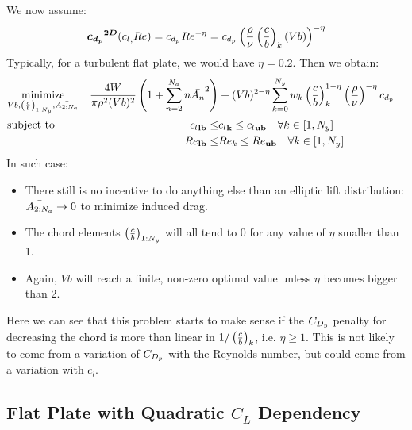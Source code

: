 \documentclass[letterpaper,12pt]{article}
\begin{document}
We now assume:
$$\boldsymbol{{c_{d_p}}^{2D}}({c_l}_{\bf ,} Re) = {c_{d_p}}_{\bf } Re^{-\eta} = {c_{d_p}}_{\bf }
\left(\frac{\rho}{\nu}\left( \frac c b \right)_{k}(Vb)\right)^{-\eta}$$
Typically, for a turbulent flat plate, we would have $\eta=0.2$.
Then we obtain:
\begin{align*}
	& \underset{Vb, \left( \frac c b \right)_{1:N_y}, \bar{A_{2:N_a}}}{\text{minimize}}  &
	\frac{4W}{\pi \rho^2 (Vb)^2} \left(1+\sum_{n=2}^{N_a} n \bar{A_{n}}^2\right) &+
	(Vb)^{2-\eta} \sum_{k=0}^{N_y} w_k \left( \frac c b \right)_{k}^{1-\eta} \left(\frac{\rho}{\nu}\right)^{-\eta}{c_{d_p}}_{\bf }  & \\
	& \text{subject to} & {c_l}_{\bf lb} \leq &{c_l}_{\bf k} \leq {c_l}_{\bf ub} \quad \forall k \in [1, N_y] \\
	& & {Re}_{\bf lb} \leq &{Re_k} \leq {Re}_{\bf ub} \quad \forall k \in [1, N_y] 
\end{align*}
%
In such case:
\begin{itemize}
	\item There still is no incentive to do anything else than an elliptic lift distribution: $\bar{A_{2:N_a}} \rightarrow 0 $ to minimize induced drag.
	\item  The chord elements $\left( \frac c b \right)_{1:N_y}$ will all tend to 0 for any value of $\eta$ smaller than 1.
	\item Again, $Vb$ will reach a finite, non-zero optimal value unless $\eta$ becomes bigger than 2.
\end{itemize}
%
Here we can see that this problem starts to make sense if the $C_{D_p}$ penalty for decreasing the chord is more than linear in $1/\left( \frac c b \right)_{k}$, i.e. $\eta \geq 1$. This is not likely to come from a variation of $C_{D_p}$ with the Reynolds number, but could come from a variation with $c_l$.

\subsection{Flat Plate with Quadratic $C_L$ Dependency}
\end{document}
